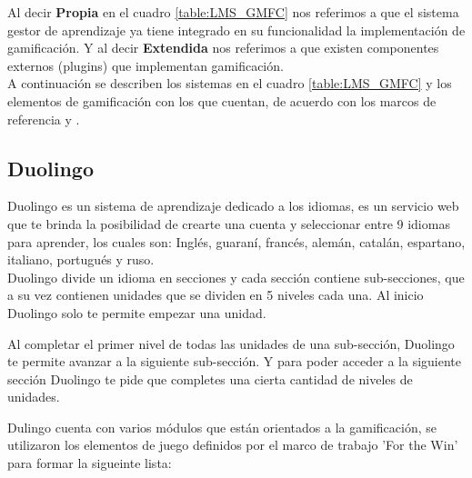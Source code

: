 \noindent Al decir \textbf{Propia} en el cuadro \ref{table:LMS_GMFC} nos referimos a que el sistema gestor de aprendizaje ya tiene integrado en su funcionalidad la implementación  de gamificación. Y al decir \textbf{Extendida} nos referimos a que existen componentes externos (plugins) que implementan gamificación. \\
    
\noindent A continuación se describen los sistemas en el cuadro \ref{table:LMS_GMFC} y los elementos de gamificación con los que cuentan, de acuerdo con los marcos de referencia  y .
    
\begin{multicols}{2}    
\subsection*{Duolingo}
    
Duolingo es un sistema de aprendizaje dedicado a los idiomas, es un servicio web que te brinda la posibilidad de crearte una cuenta y seleccionar entre 9 idiomas para aprender, los cuales son: Inglés, guaraní, francés, alemán, catalán, espartano, italiano, portugués y ruso.\\
    
\noindent Duolingo divide un idioma en secciones y cada sección contiene sub-secciones, que a su vez contienen unidades que se dividen en 5 niveles cada una. Al inicio Duolingo solo te permite empezar una unidad.
    
\noindent Al completar el primer nivel de todas las unidades de una sub-sección, Duolingo te permite avanzar a la siguiente sub-sección. Y para poder acceder a la siguiente sección Duolingo te pide que completes una cierta cantidad de niveles de unidades.\\
    
\clearpage
    
    \noindent Dulingo cuenta con varios módulos que están orientados a la gamificación, se utilizaron los elementos de juego definidos por el marco de trabajo 'For the Win' para formar la sigueinte lista:
    

\end{multicols}
